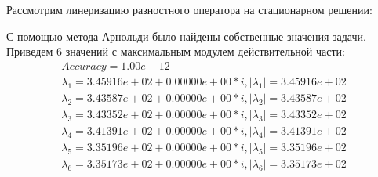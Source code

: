 \documentclass[12pt,a4paper]{article}
\begin{document}
Рассмотрим линеризацию разностного оператора на стационарном решении:
\begin{figure}[h!]
\end{figure}
\begin{figure}[h!]
\end{figure}
\begin{figure}[h!]
\end{figure}
\begin{figure}[h!]
\end{figure}
\newpage

С помощью метода Арнольди было найдены собственные значения задачи. Приведем 6 значений с  максимальным модулем действительной части:
\begin{eqnarray*}
	Accuracy = 1.00e-12 \\
	\lambda_1 = 3.45916e+02 + 0.00000e+00 * i, |\lambda_1| = 3.45916e+02 \\
	\lambda_2 = 3.43587e+02 + 0.00000e+00 * i, |\lambda_2| = 3.43587e+02 \\ 
	\lambda_3 = 3.43352e+02 + 0.00000e+00 * i, |\lambda_3| = 3.43352e+02 \\
	\lambda_4 = 3.41391e+02 + 0.00000e+00 * i, |\lambda_4| = 3.41391e+02 \\
	\lambda_5 = 3.35196e+02 + 0.00000e+00 * i, |\lambda_5| = 3.35196e+02 \\
	\lambda_6 = 3.35173e+02 + 0.00000e+00 * i, |\lambda_6| = 3.35173e+02
\end{eqnarray*}
\end{document}
